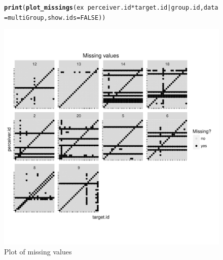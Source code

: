 \documentclass[a4paper]{article}\usepackage[]{graphicx}\usepackage[]{color}
\makeatletter
\def\maxwidth{ %
  \ifdim\Gin@nat@width>\linewidth
    \linewidth
  \else
    \Gin@nat@width
  \fi
}
\newcommand{\hlnum}[1]{\textcolor[rgb]{0.686,0.059,0.569}{#1}}%
\newcommand{\hlopt}[1]{\textcolor[rgb]{0,0,0}{#1}}%
\newcommand{\hlstd}[1]{\textcolor[rgb]{0.345,0.345,0.345}{#1}}%
\newcommand{\hlkwc}[1]{\textcolor[rgb]{0.333,0.667,0.333}{#1}}%
\newcommand{\hlkwd}[1]{\textcolor[rgb]{0.737,0.353,0.396}{\textbf{#1}}}%
\newenvironment{kframe}{%
 \def\at@end@of@kframe{}%
 \ifinner\ifhmode%
  \def\at@end@of@kframe{\end{minipage}}%
  \begin{minipage}{\columnwidth}%
 \fi\fi%
 \def\FrameCommand##1{\hskip\@totalleftmargin \hskip-\fboxsep
 \colorbox{shadecolor}{##1}\hskip-\fboxsep
     \hskip-\linewidth \hskip-\@totalleftmargin \hskip\columnwidth}%
 \MakeFramed {\advance\hsize-\width
   \@totalleftmargin\z@ \linewidth\hsize
   \@setminipage}}%
 {\par\unskip\endMakeFramed%
 \at@end@of@kframe}
\newenvironment{knitrout}{}{} %
\makeatother
\begin{document}
\begin{figure} 
\begin{center} 
\begin{knitrout}\small
{}\color{fgcolor}\begin{kframe}
\begin{alltt}
\hlkwd{print}\hlstd{(}\hlkwd{plot_missings}\hlstd{(ex} \hlopt{~} \hlstd{perceiver.id} \hlopt{*} \hlstd{target.id} \hlopt{|} \hlstd{group.id,} \hlkwc{data} \hlstd{= multiGroup,} \hlkwc{show.ids} \hlstd{=} \hlnum{FALSE}\hlstd{))}
\end{alltt}
\end{kframe}
\includegraphics[width=\maxwidth]{Sweave-Files/Sw_unnamed-chunk-16-1} 

\end{knitrout}
\end{center}
\caption{Plot of missing values}
\label{fig:pmiss}
\end{figure}
\end{document}

